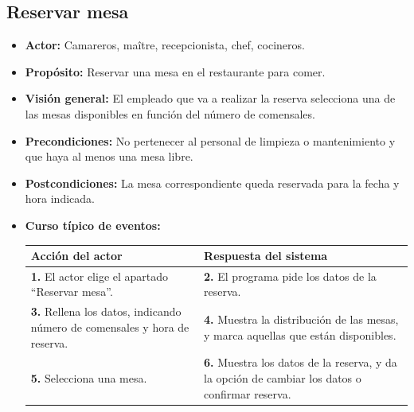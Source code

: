 \documentclass[spanish,a4paper,11pt, twoside]{report}	%
\begin{document}
		
		\subsection{Reservar mesa} 
			\begin{itemize}
			\item \textbf{Actor:} Camareros, maître, recepcionista, chef, cocineros.
			\item \textbf{Propósito:} Reservar una mesa en el restaurante para comer.
			\item \textbf{Visión general:} El empleado que va a realizar la reserva
					selecciona una de las mesas disponibles en función del número de comensales.
			\item \textbf{Precondiciones:} No pertenecer al personal de limpieza o
					mantenimiento y que haya al menos una mesa libre.
			\item \textbf{Postcondiciones:} La mesa correspondiente queda reservada para la
					fecha y hora indicada.
			\item \textbf{Curso típico de eventos:} 	\\
				\begin{tabular}{|p{6cm}||p{6cm}|}
				\hline
				\textbf{Acción del actor} & \textbf{Respuesta del sistema} \\ \hline \hline
				  \textbf{1.} El actor elige el apartado ``Reservar mesa''. &
				  \textbf{2.} El programa pide los datos de la reserva.		\\ \hline
				  \textbf{3.} Rellena los datos, indicando número de comensales y hora de reserva. &
				  \textbf{4.} Muestra la distribución de las mesas, y marca aquellas que están disponibles.	\\ \hline
				  \textbf{5.} Selecciona una mesa. &
				  \textbf{6.} Muestra los datos de la reserva, y da la opción de cambiar los datos o confirmar reserva.	
				  	\\ \hline
			\end{tabular}
			\\
		\end {itemize}
		
\end{document}
